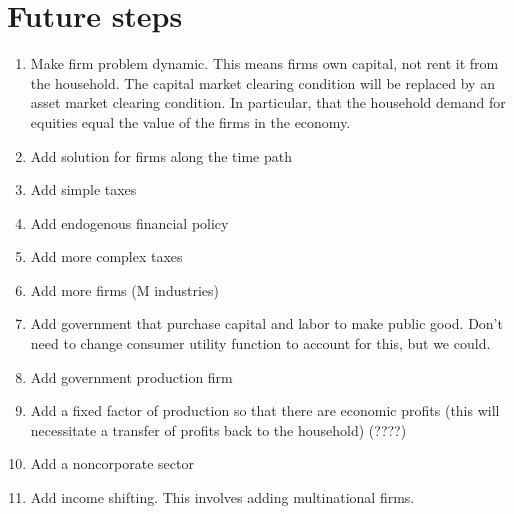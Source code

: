 \documentclass[letterpaper,12pt]{article}
\theoremstyle{definition}
\begin{document}
\section*{Future steps}

\begin{enumerate}
\item Make firm problem dynamic. This means firms own capital, not rent it from the household.  The capital market clearing condition will be replaced by an asset market clearing condition.  In particular, that the household demand for equities equal the value of the firms in the economy.
\item Add solution for firms along the time path
\item Add simple taxes
\item Add endogenous financial policy
\item Add more complex taxes
\item Add more firms (M industries)
\item Add government that purchase capital and labor to make public good.  Don't need to change consumer utility function to account for this, but we could.
\item Add government production firm
\item Add a fixed factor of production so that there are economic profits (this will necessitate a transfer of profits back to the household) (????)
\item Add a noncorporate sector
\item Add income shifting.  This involves adding multinational firms.
\end{enumerate}
\end{document}
